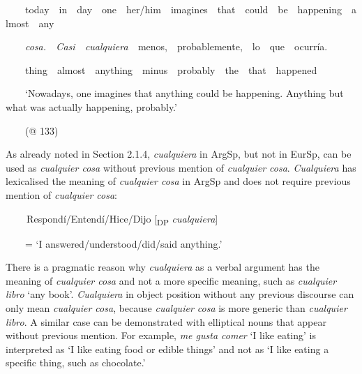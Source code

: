\begin{styleStandard}
\ \ \ \ today\ \ in\ \ day\ \ one\ \ her/him\ \ imagines\ \ that\ \ could\ \ be\ \ happening\ \ almost\ \ any
\end{styleStandard}

\begin{styleStandard}
\ \ \ \ \textit{cosa.\ \ Casi\ \ cualquiera\ \ }menos,\ \ probablemente,\ \ lo\ \ que\ \ ocurría.
\end{styleStandard}

\begin{styleStandard}
\ \ \ \ thing\ \ almost\ \ anything\ \ minus\ \ probably\ \ the\ \ that\ \ happened
\end{styleStandard}

\begin{styleStandard}
\ \ \ \ ‘Nowadays, one imagines that anything could be happening. Anything but what was actually happening, probably.’
\end{styleStandard}

\begin{styleStandard}
\ \ \ \ (@ 133)
\end{styleStandard}

\begin{styleStandard}
As already noted in Section 2.1.4, \textit{cualquiera} in ArgSp, but not in EurSp, can be used as \textit{cualquier cosa} without previous mention of \textit{cualquier cosa}. \textit{Cualquiera} has lexicalised the meaning of \textit{cualquier cosa} in ArgSp and does not require previous mention of \textit{cualquier cosa}:
\end{styleStandard}

\begin{styleStandard}
\label{bkm:Ref150786811}\textbf{\ \ }\ \ Respondí/Entendí/Hice/Dijo [\textsubscript{DP} \textit{cualquiera}] 
\end{styleStandard}

\begin{styleStandard}
\ \ \ \ = ‘I answered/understood/did/said anything.’
\end{styleStandard}

\begin{styleStandard}
There is a pragmatic reason why \textit{cualquiera} as a verbal argument has the meaning of \textit{cualquier cosa} and not a more specific meaning, such as \textit{cualquier libro} ‘any book’. \textit{Cualquiera} in object position without any previous discourse can only mean \textit{cualquier cosa}, because \textit{cualquier cosa} is more generic than \textit{cualquier libro}. A similar case can be demonstrated with elliptical nouns that appear without previous mention. For example, \textit{me gusta comer} ‘I like eating’ is interpreted as ‘I like eating food or edible things’ and not as ‘I like eating a specific thing, such as chocolate.’
\end{styleStandard}

